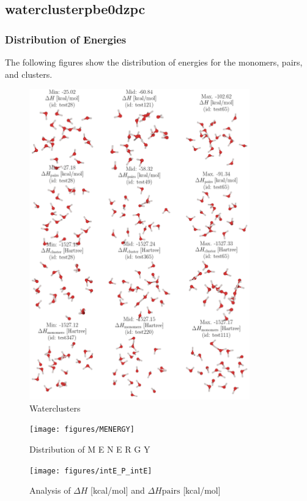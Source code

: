 \documentclass[journal=jacsat,manuscript=article]{achemso}
\begin{document}
\subsection{waterclusterpbe0dzpc}
\subsubsection{Distribution of Energies} 
 The following figures show the distribution of energies for the monomers, pairs, and clusters.

\begin{figure}
    \centering
    \includegraphics[width=0.85\textwidth]{figures/Waterclustersmols}
    \caption{ Waterclusters }
    \label{fig:Waterclustersmols}
\end{figure}

\begin{figure}
    \centering
    \texttt{[image: figures/MENERGY]}
    \caption{ Distribution of  M E N E R G Y }
    \label{fig:singlekey}
\end{figure}

\begin{figure}
    \centering
    \texttt{[image: figures/intE\_P\_intE]}
    \caption{ Analysis of $\Delta H$ [kcal/mol] and $\Delta H{\mathrm{pairs}}$ [kcal/mol] }
    \label{fig:_intE_P_intE}
\end{figure}
\end{document}
